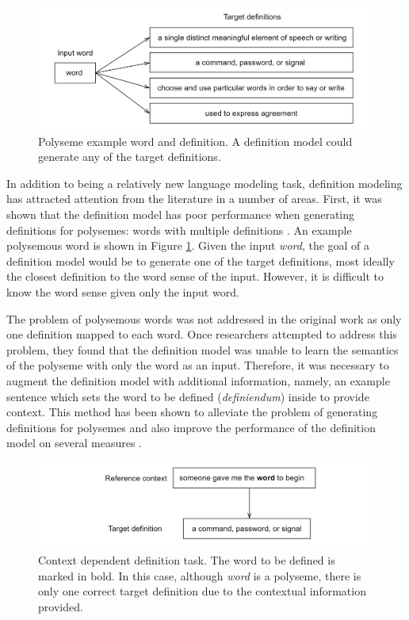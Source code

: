 \begin{figure}[h]
    \centering
    \includegraphics[width=1\textwidth]{assets/figures/polyseme.png}
    \caption{Polyseme example word and definition. A definition model could generate any of the target definitions.}
    \label{fig:polyseme}
\end{figure}

In addition to being a relatively new language modeling task, definition
modeling has attracted attention from the literature in a number of areas.
First, it was shown that the definition model has poor performance when
generating definitions for polysemes: words with multiple definitions
\cite{gadetsky_conditional_2018}. An example polysemous word is shown in Figure
\ref{fig:polyseme}. Given the input \textit{word}, the goal of a definition
model would be to generate one of the target definitions, most ideally the
closest definition to the word sense of the input. However, it is difficult to
know the word sense given only the input word.

The problem of polysemous words was not addressed in the original work as only
one definition mapped to each word. Once researchers attempted to address this
problem, they found that the definition model was unable to learn the semantics
of the polyseme with only the word as an input. Therefore, it was necessary to
augment the definition model with additional information, namely, an example
sentence which sets the word to be defined (\textit{definiendum}) inside to
provide context. This method has been shown to alleviate the problem of
generating definitions for polysemes and also improve the performance of the
definition model on several measures \cite{bevilacqua_generationary_2020,
gadetsky_conditional_2018, mickus_mark_2019}.

\begin{figure}[h]
    \centering
    \includegraphics[width=1\textwidth]{assets/figures/context.png}
    \caption{Context dependent definition task. The word to be defined is marked in bold. In this case, although \textit{word} is a polyseme, there is only one correct target definition due to the contextual information provided.}
    \label{fig:context_poly}
\end{figure}

